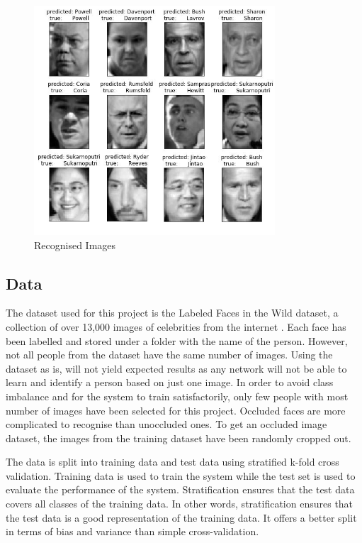 \documentclass[conference]{IEEEtran}
\begin{document}
\begin{figure}[h!]
 \centering
 \includegraphics[width = 9cm]{PCA_pred.JPG}
 \caption{Recognised Images}
 \label{fig 4: Ouput}
\end{figure}


\subsection{Data} 
\label{subsec: 4a. Data}
The dataset used for this project is the Labeled Faces in the Wild dataset, a collection of over 13,000 images of celebrities from the internet \cite{LFWTech}. Each face has been labelled and stored under a folder with the name of the person. However, not all people from the dataset have the same number of images. Using the dataset as is, will not yield expected results as any network will not be able to learn and identify a person based on just one image. In order to avoid class imbalance and for the system to train satisfactorily, only few people with most number of images have been selected for this project. Occluded faces are more complicated to recognise than unoccluded ones. To get an occluded image dataset, the images from the training dataset have been randomly cropped out. 

The data is split into training data and test data using stratified k-fold cross validation. Training data is used to train the system while the test set is used to evaluate the performance of the system. Stratification ensures that the test data covers all classes of the training data. In other words, stratification ensures that the test data is a good representation of the training data. It offers a better split in terms of bias and variance than simple cross-validation. 
\end{document}
